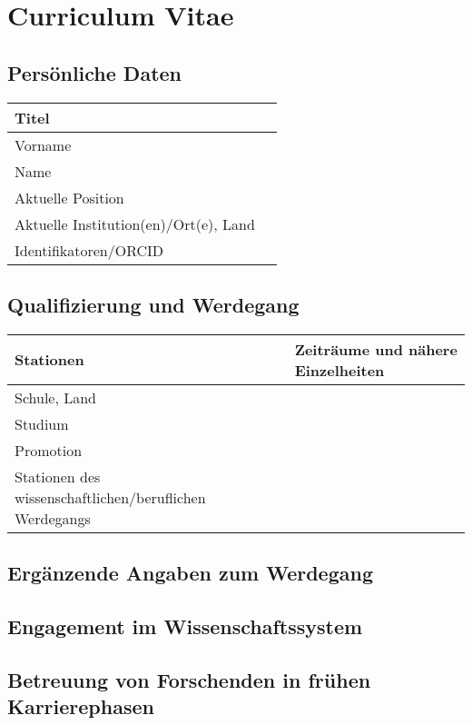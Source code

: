 \documentclass{scrartcl}
\begin{document}
\section*{Curriculum Vitae}

\subsection*{Persönliche Daten}

\begin{tabular}{|>{\raggedright}p{}|p{}|}
\hline
Titel & \\
\hline
Vorname & \\
\hline
Name & \\
\hline
Aktuelle Position &  \\
\hline
Aktuelle Institution(en)/Ort(e), Land & \\
\hline
Identifikatoren/ORCID & \\
\hline
\end{tabular}

\subsection*{Qualifizierung und Werdegang}

\begin{tabular}{|>{\raggedright}p{}|p{}|}
\hline
\textbf{Stationen} & \textbf{Zeiträume und nähere Einzelheiten} \\
\hline
Schule, Land & \\ %
\hline
Studium & \\
\hline
Promotion & \\
\hline
Stationen des wissenschaftlichen/beruflichen Werdegangs & \\ %
\hline
\end{tabular}

\subsection*{Ergänzende Angaben zum Werdegang}

\subsection*{Engagement im Wissenschaftssystem}

\subsection*{Betreuung von Forschenden in frühen Karrierephasen}
\end{document}
